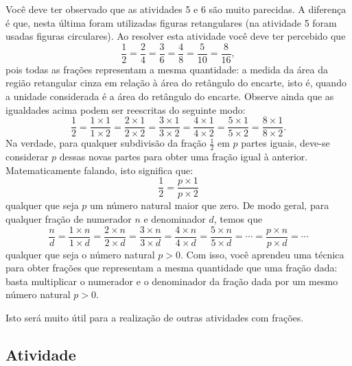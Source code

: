 \begin{refletindo*}[breakable]{}{}
  Você deve ter observado que as atividades 5 e 6 são muito parecidas.
  A diferença é que, nesta última foram utilizadas figuras retangulares (na atividade 5 foram usadas figuras circulares).
  Ao resolver esta atividade você deve ter percebido que
  $$\dfrac{1}{2}=\dfrac{2}{4}=\dfrac{3}{6}=\dfrac{4}{8}=\dfrac{5}{10}=\dfrac{8}{16},$$
  pois todas as frações representam a mesma quantidade: a medida da área da região retangular cinza em relação à área do retângulo do encarte, isto é, quando a unidade considerada é a área do retângulo do encarte.
  Observe ainda que as igualdades acima podem ser reescritas do seguinte modo:
  $$\dfrac{1}{2}=\dfrac{1 \times 1}{1 \times 2}= \dfrac{2 \times 1}{2 \times 2} =\dfrac{3 \times 1}{3 \times 2} = \dfrac{4 \times 1}{4 \times 2} = \dfrac{5 \times 1}{5 \times 2}= \dfrac{8 \times 1}{8 \times 2}.$$
  Na verdade, para qualquer subdivisão da fração   $\frac{1}{2}$ em   $p$ partes iguais, deve-se considerar   $p$ dessas novas partes para obter uma fração igual à anterior. Matematicamente falando, isto significa que:
  $$\dfrac{1}{2}= \dfrac{p \times 1}{p \times 2}$$
  qualquer que seja   $p$ um número natural maior que zero.
  De modo geral, para qualquer fração    de numerador $n$ e denominador $d$,  temos que
  $$\dfrac{n}{d}=\dfrac{1 \times n}{1 \times d}= \dfrac{2 \times n}{2 \times d} = \dfrac{3 \times n}{3 \times d} = \dfrac{4 \times n}{4 \times d} = \dfrac{5 \times n}{5 \times d}=\cdots =  \dfrac{p \times n}{p \times d}= \cdots$$
  qualquer que seja o número natural   $p > 0$.
  Com isso, você aprendeu uma técnica para obter frações que representam a mesma quantidade que uma fração dada: basta multiplicar o numerador e o denominador da fração dada por um mesmo número natural   $p > 0$.

  Isto será muito útil para a realização de outras atividades com frações.
\end{refletindo*}



\subsection{Atividade}



